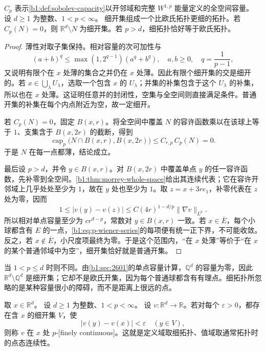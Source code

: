 \begin{proposition}\label{b1:prop:p-fine-topology-basic}
\(C_p\) 表示\cref{b1:def:sobolev-capacity}以开邻域和完整 \(W^{1,p}\) 能量定义的全空间容量。
设 \(d\geq1\) 为整数、\(1<p<\infty\)。
细开集组成一个比欧氏拓扑更细的拓扑。若 \(C_p(N)=0\)，则 \(\mathbb R^d\setminus N\) 为细开集。若 \(p>d\)，细拓扑恰好等于欧氏拓扑。
\end{proposition}
\begin{proof}
薄性对取子集保持。相对容量的次可加性与
\[
 (a+b)^q\le\max(1,2^{q-1})(a^q+b^q),\quad
 a,b\ge0,\quad q=\frac1{p-1},
\]
又说明有限个在 \(x\) 处薄的集合之并仍在 \(x\) 处薄。因此有限个细开集的交是细开的。若 \(x\in\bigcup_\lambda U_\lambda\)，选取一个包含 \(x\) 的 \(U_\lambda\)；并集的补集包含于这个 \(U_\lambda\) 的补集，所以也在 \(x\) 处薄。这证明任意并的封闭性，空集与全空间则直接满足条件。普通开集的补集在每个内点附近为空，故一定细开。

若 \(C_p(N)=0\)，固定 \(B(x,r)\)。将全空间中覆盖 \(N\) 的容许函数乘以在该球上等于 \(1\)、支集含于 \(B(x,2r)\) 的截断，得到
\[
 \operatorname{cap}_p\bigl(N\cap B(x,r),B(x,2r)\bigr)
 \le C_{r,p}\,C_p(N)=0.
\]
于是 \(N\) 在每一点都薄，结论成立。

最后设 \(p>d\)，并令 \(y\in B(x,r)\)。对 \(B(x,2r)\) 中覆盖单点 \(y\) 的任一容许函数，先补零到全空间。\cref{b1:thm:morrey-whole-space}给出其连续代表；它在容许开邻域上几乎处处至少为 \(1\)，故在 \(y\) 处也至少为 \(1\)。取 \(z=x+3re_1\)，补零代表在 \(z\) 处为零，因而
\[
 1\le |v(y)-v(z)|
 \le C(4r)^{1-d/p}\|\nabla v\|_{L^p}.
\]
所以相对单点容量至少为 \(cr^{d-p}\)，常数对 \(y\in B(x,r)\) 一致。若 \(x\in\overline E\)，每个小球都含有 \(E\) 的一点，\eqref{b1:eq:p-wiener-series}的每项便有统一正下界，不可能收敛。反之，若 \(x\notin\overline E\)，小尺度项最终为零。于是这个范围内，“在 \(x\) 处薄”等价于“在 \(x\) 的某个普通邻域中为空”，细开集恰好就是普通开集。
\end{proof}

当 \(1<p\le d\) 时则不同。由\cref{b1:sec:2601}的单点容量计算，\(\mathbb Q^d\) 的容量为零，因此 \(\mathbb R^d\setminus\mathbb Q^d\) 是细开集；它却不是欧氏开集，因为每个普通球都含有有理点。细拓扑所忽略的是某种容量很小的障碍，而不是距离上很远的点。

\begin{definition}\label{b1:def:p-fine-continuity}
取 \(x\in\mathbb R^d\)。
设 \(d\geq1\) 为整数、\(1<p<\infty\)。
设 \(v\colon\mathbb R^d\to\mathbb R\)。若对每个 \(\varepsilon>0\)，都存在含 \(x\) 的细开集 \(V\)，使
\[
 |v(y)-v(x)|<\varepsilon\quad(y\in V),
\]
则称 \(v\) 在 \(x\) 处 \(p\)-[finely continuous]。这就是定义域取细拓扑、值域取通常拓扑时的点态连续性。
\end{definition}

